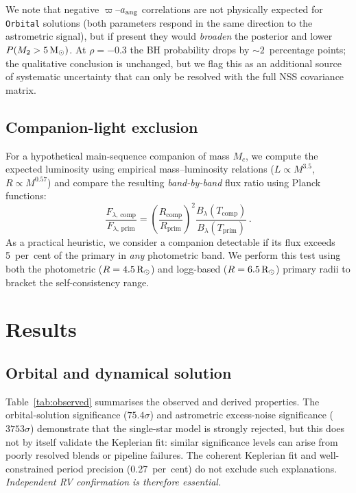 \documentclass[usenatbib,fleqn]{mnras}
\newcommand{\Msun}{{\rm M}_\odot}
\newcommand{\Rsun}{{\rm R}_\odot}
\begin{document}
We note that negative $\varpi$--$a_{\rm ang}$ correlations are
not physically expected for \texttt{Orbital} solutions (both
parameters respond in the same direction to the astrometric
signal), but if present they would \emph{broaden} the posterior
and lower $P(M_2 > 5\,\Msun)$.  At $\rho = -0.3$ the BH
probability drops by $\sim 2$~percentage points; the qualitative
conclusion is unchanged, but we flag this as an additional source
of systematic uncertainty that can only be resolved with the full
NSS covariance matrix.

\subsection{Companion-light exclusion}
\label{sec:methods:companion}

For a hypothetical main-sequence companion of mass $M_c$, we
compute the expected luminosity using empirical mass--luminosity
relations ($L \propto M^{3.5}$, $R \propto M^{0.57}$) and compare
the resulting \emph{band-by-band} flux ratio using Planck functions:
\begin{equation}
\frac{F_{\lambda,\,\mathrm{comp}}}{F_{\lambda,\,\mathrm{prim}}}
= \left(\frac{R_{\mathrm{comp}}}{R_{\mathrm{prim}}}\right)^2
  \frac{B_\lambda(T_{\mathrm{comp}})}{B_\lambda(T_{\mathrm{prim}})}\,.
\label{eq:fluxratio}
\end{equation}
As a practical heuristic, we consider a companion detectable if
its flux exceeds 5~per~cent
of the primary in \emph{any} photometric band.  We perform this
test using both the photometric ($R = 4.5\,\Rsun$) and logg-based
($R = 6.5\,\Rsun$) primary radii to bracket the self-consistency
range.

\section{Results}
\label{sec:results}

\subsection{Orbital and dynamical solution}
\label{sec:results:orbit}

Table~\ref{tab:observed} summarises the observed and derived
properties.  The orbital-solution significance ($75.4\sigma$)
and astrometric excess-noise significance ($3753\sigma$)
demonstrate that the single-star model is strongly rejected, but
this does not by itself validate the Keplerian fit: similar
significance levels can arise from poorly resolved blends or
pipeline failures.
The coherent Keplerian fit and well-constrained period precision
(0.27~per~cent) do not exclude such
explanations.  \emph{Independent RV confirmation is therefore
essential.}
\end{document}
